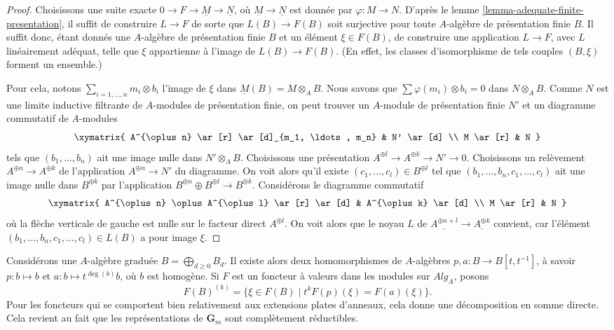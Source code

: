 \begin{proof}
Choisissons une suite exacte $0 \to F \to \underline{M} \to \underline{N}$,
où $\underline{M} \to \underline{N}$ est donnée par
$\varphi : M \to N$. D'après le
lemme \ref{lemma-adequate-finite-presentation},
il suffit de construire $L \to F$ de sorte que $L(B) \to F(B)$ soit surjective
pour toute $A$-algèbre de présentation finie $B$. Il suffit donc, étant donnés
une $A$-algèbre de présentation finie $B$ et un élément $\xi \in F(B)$,
de construire une application $L \to F$, avec $L$ linéairement adéquat, telle que $\xi$
appartienne à l'image de $L(B) \to F(B)$.
(En effet, les classes d'isomorphisme de tels couples $(B, \xi)$ forment un ensemble.)

\medskip\noindent
Pour cela, notons $\sum_{i = 1, \ldots, n} m_i \otimes b_i$ l'image de
$\xi$ dans $\underline{M}(B) = M \otimes_A B$. Nous savons que
$\sum \varphi(m_i) \otimes b_i = 0$ dans $N \otimes_A B$.
Comme $N$ est une limite inductive filtrante de $A$-modules de présentation finie,
on peut trouver un $A$-module de présentation finie $N'$ et un diagramme commutatif
de $A$-modules
$$
\xymatrix{
A^{\oplus n} \ar[r] \ar[d]_{m_1, \ldots, m_n} & N' \ar[d] \\
M \ar[r] & N
}
$$
tels que $(b_1, \ldots, b_n)$ ait une image nulle dans $N' \otimes_A B$.
Choisissons une présentation $A^{\oplus l} \to A^{\oplus k} \to N' \to 0$.
Choisissons un relèvement $A^{\oplus n} \to A^{\oplus k}$ de l'application
$A^{\oplus n} \to N'$ du diagramme. On voit alors qu'il existe
$(c_1, \ldots, c_l) \in B^{\oplus l}$ tel que
$(b_1, \ldots, b_n, c_1, \ldots, c_l)$ ait une image nulle dans $B^{\oplus k}$
par l'application $B^{\oplus n} \oplus B^{\oplus l} \to B^{\oplus k}$.
Considérons le diagramme commutatif
$$
\xymatrix{
A^{\oplus n} \oplus A^{\oplus l} \ar[r] \ar[d] & A^{\oplus k} \ar[d] \\
M \ar[r] & N
}
$$
où la flèche verticale de gauche est nulle sur le facteur direct $A^{\oplus l}$.
On voit alors que le noyau $L$ de $\underline{A^{\oplus n + l}}
\to \underline{A^{\oplus k}}$ convient, car l'élément
$(b_1, \ldots, b_n, c_1, \ldots, c_l) \in L(B)$ a pour image $\xi$.
\end{proof}

\noindent
Considérons une $A$-algèbre graduée $B = \bigoplus_{d \geq 0} B_d$. Il existe alors
deux homomorphismes de $A$-algèbres $p, a : B \to B[t, t^{-1}]$, à savoir
$p : b \mapsto b$ et $a : b \mapsto t^{\deg(b)} b$, où $b$ est homogène.
Si $F$ est un foncteur à valeurs dans les modules sur $\textit{Alg}_A$, posons
\begin{equation}
\label{equation-weight-k}
F(B)^{(k)} = \{\xi \in F(B) \mid t^k F(p)(\xi) = F(a)(\xi)\}.
\end{equation}
Pour les foncteurs qui se comportent bien relativement aux extensions plates
d'anneaux, cela donne une décomposition en somme directe. Cela revient au fait
que les représentations de $\mathbf{G}_m$ sont complètement réductibles.

